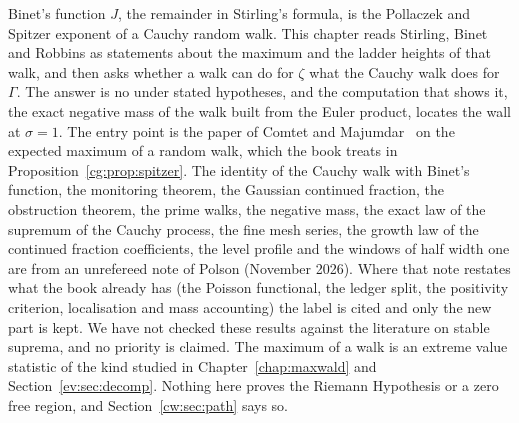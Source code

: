 \label{cw:ch:cwalk}

Binet's function $J$, the remainder in Stirling's formula, is the Pollaczek and Spitzer exponent of a Cauchy random walk. This chapter reads Stirling, Binet and Robbins as statements about the maximum and the ladder heights of that walk, and then asks whether a walk can do for $\zeta$ what the Cauchy walk does for $\Gamma$. The answer is no under stated hypotheses, and the computation that shows it, the exact negative mass of the walk built from the Euler product, locates the wall at $\sigma=1$. The entry point is the paper of Comtet and Majumdar~\cite{ComtetMajumdar05} on the expected maximum of a random walk, which the book treats in Proposition~\ref{cg:prop:spitzer}. The identity of the Cauchy walk with Binet's function, the monitoring theorem, the Gaussian continued fraction, the obstruction theorem, the prime walks, the negative mass, the exact law of the supremum of the Cauchy process, the fine mesh series, the growth law of the continued fraction coefficients, the level profile and the windows of half width one are from an unrefereed note of Polson (November 2026). Where that note restates what the book already has (the Poisson functional, the ledger split, the positivity criterion, localisation and mass accounting) the label is cited and only the new part is kept. We have not checked these results against the literature on stable suprema, and no priority is claimed. The maximum of a walk is an extreme value statistic of the kind studied in Chapter~\ref{chap:maxwald} and Section~\ref{ev:sec:decomp}. Nothing here proves the Riemann Hypothesis or a zero free region, and Section~\ref{cw:sec:path} says so.

